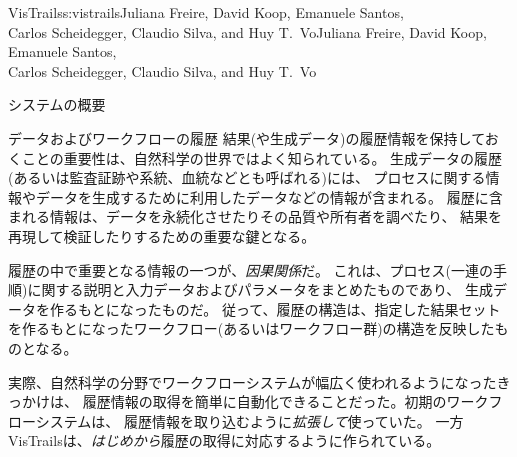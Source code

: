 \begin{aosachaptertoc}{VisTrails}{s:vistrails}{Juliana Freire, David Koop, Emanuele Santos, \\ Carlos Scheidegger, Claudio Silva, and Huy T.\ Vo}{Juliana Freire, David Koop, Emanuele Santos, \\ \hspace*{0.9cm} Carlos Scheidegger, Claudio Silva, and Huy T.\ Vo}
\begin{aosasect1}{システムの概要}
\begin{aosasect2}{データおよびワークフローの履歴}
結果(や生成データ)の履歴情報を保持しておくことの重要性は、自然科学の世界ではよく知られている。
生成データの履歴(あるいは監査証跡や系統、血統などとも呼ばれる)には、
プロセスに関する情報やデータを生成するために利用したデータなどの情報が含まれる。
履歴に含まれる情報は、データを永続化させたりその品質や所有者を調べたり、
結果を再現して検証したりするための重要な鍵となる\cite{bib:freire:provenance}。

履歴の中で重要となる情報の一つが、\emph{因果関係}だ。
これは、プロセス(一連の手順)に関する説明と入力データおよびパラメータをまとめたものであり、
生成データを作るもとになったものだ。
従って、履歴の構造は、指定した結果セットを作るもとになったワークフロー(あるいはワークフロー群)の構造を反映したものとなる。

実際、自然科学の分野でワークフローシステムが幅広く使われるようになったきっかけは、
履歴情報の取得を簡単に自動化できることだった。初期のワークフローシステムは、
履歴情報を取り込むように\emph{拡張して}使っていた。
一方VisTrailsは、\emph{はじめから}履歴の取得に対応するように作られている。


\end{aosasect2}


\end{aosasect1}
\end{aosachaptertoc}
